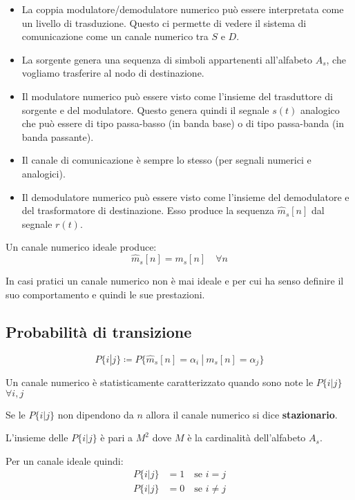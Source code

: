 \begin{itemize}
    \item La coppia modulatore/demodulatore numerico può essere interpretata come un livello di trasduzione. Questo ci permette di vedere il sistema di comunicazione come un canale numerico tra \( S \) e \( D \).
    \item La sorgente genera una sequenza di simboli appartenenti all'alfabeto \( A_s \), che vogliamo trasferire al nodo di destinazione.
    \item Il modulatore numerico può essere visto come l'insieme del trasduttore di sorgente e del modulatore. Questo genera quindi il segnale \( s(t) \) analogico che può essere di tipo passa-basso (in banda base) o di tipo passa-banda (in banda passante).
    \item Il canale di comunicazione è sempre lo stesso (per segnali numerici e analogici).



    \item Il demodulatore numerico può essere visto come l'insieme del demodulatore e del trasformatore di destinazione. Esso produce la sequenza $\hat{m}_s[n]$ dal segnale $r(t)$.

\end{itemize}

Un canale numerico ideale produce:
\begin{equation}
    \hat{m}_s[n] = m_s[n] \quad \forall n
\end{equation}

In casi pratici un canale numerico non è mai ideale e per cui ha senso definire il suo comportamento e quindi le sue prestazioni.

\subsection*{Probabilità di transizione}
\begin{equation}
    P\{i|j\} \coloneqq P\{\hat{m}_s[n]=\alpha_i
    \ |\  m_s[n]=\alpha_j\}
\end{equation}

Un canale numerico è statisticamente caratterizzato quando sono note le $P\{i|j\}$ $\forall i,j$

Se le $P\{i|j\}$ non dipendono da $n$ allora il canale numerico si dice \textbf{stazionario}.

L'insieme delle $P\{i|j\}$ è pari a $M^2$ dove $M$ è la cardinalità dell'alfabeto $A_s$.

Per un canale ideale quindi:
\begin{align}
    P\{i|j\} & = 1 \quad \text{se } i=j      \\
    P\{i|j\} & = 0 \quad \text{se } i \neq j
\end{align}

